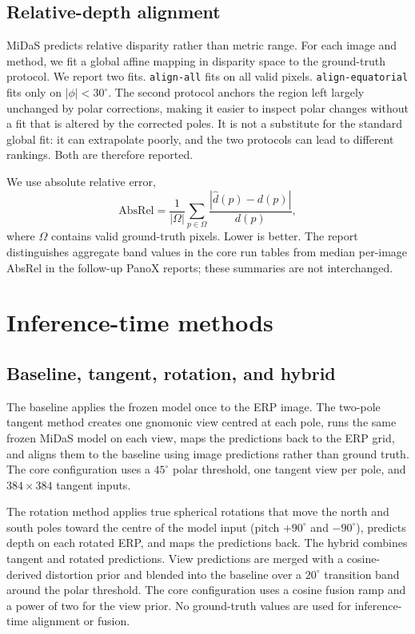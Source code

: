 \documentclass{article}
\newcommand{\AbsRel}{\mathrm{AbsRel}}
\begin{document}
\subsection{Relative-depth alignment}

MiDaS predicts relative disparity rather than metric range. For each image and method, we fit a global affine mapping in disparity space to the ground-truth protocol. We report two fits. \texttt{align-all} fits on all valid pixels. \texttt{align-equatorial} fits only on $|\phi|<30^\circ$. The second protocol anchors the region left largely unchanged by polar corrections, making it easier to inspect polar changes without a fit that is altered by the corrected poles. It is not a substitute for the standard global fit: it can extrapolate poorly, and the two protocols can lead to different rankings. Both are therefore reported.

We use absolute relative error,
\begin{equation}
\AbsRel = \frac{1}{|\Omega|}\sum_{p\in\Omega}\frac{|\hat d(p)-d(p)|}{d(p)},
\end{equation}
where $\Omega$ contains valid ground-truth pixels. Lower is better. The report distinguishes aggregate band values in the core run tables from median per-image AbsRel in the follow-up PanoX reports; these summaries are not interchanged.

\section{Inference-time methods}

\subsection{Baseline, tangent, rotation, and hybrid}

The baseline applies the frozen model once to the ERP image. The two-pole tangent method creates one gnomonic view centred at each pole, runs the same frozen MiDaS model on each view, maps the predictions back to the ERP grid, and aligns them to the baseline using image predictions rather than ground truth. The core configuration uses a $45^\circ$ polar threshold, one tangent view per pole, and $384\times384$ tangent inputs.

The rotation method applies true spherical rotations that move the north and south poles toward the centre of the model input (pitch $+90^\circ$ and $-90^\circ$), predicts depth on each rotated ERP, and maps the predictions back. The hybrid combines tangent and rotated predictions. View predictions are merged with a cosine-derived distortion prior and blended into the baseline over a $20^\circ$ transition band around the polar threshold. The core configuration uses a cosine fusion ramp and a power of two for the view prior. No ground-truth values are used for inference-time alignment or fusion.
\end{document}
